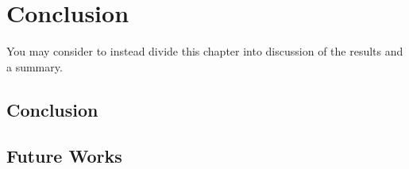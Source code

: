 \chapter{Conclusion}

You may consider to instead divide this chapter into discussion of the results and a summary. 




\section{Conclusion}


\section{Future Works}
